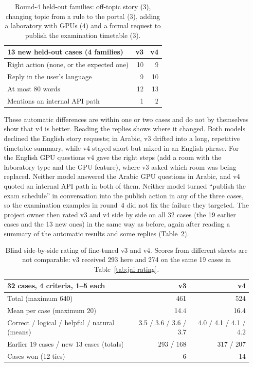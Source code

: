 \begin{table}[h]
\centering
\small
\begin{tabular}{@{}lrr@{}}
\toprule
13 new held-out cases (4 families) & v3 & v4 \\
\midrule
Right action (none, or the expected one) & 10 & 9 \\
Reply in the user's language & 9 & 10 \\
At most 80 words & 12 & 13 \\
Mentions an internal API path & 1 & 2 \\
\bottomrule
\end{tabular}
\caption{Round-4 held-out families: off-topic story (3), changing topic from a rule to the portal (3), adding a laboratory with GPUs (4) and a formal request to publish the examination timetable (3).}
\label{tab:jai-round4}
\end{table}

These automatic differences are within one or two cases and do not by themselves show that v4 is better. Reading the replies shows where it changed. Both models declined the English story requests; in Arabic, v3 drifted into a long, repetitive timetable summary, while v4 stayed short but mixed in an English phrase. For the English GPU questions v4 gave the right steps (add a room with the laboratory type and the GPU feature), where v3 asked which room was being replaced. Neither model answered the Arabic GPU questions in Arabic, and v4 quoted an internal API path in both of them. Neither model turned ``publish the exam schedule'' in conversation into the publish action in any of the three cases, so the examination examples in round~4 did not fix the failure they targeted. The project owner then rated v3 and v4 side by side on all 32 cases (the 19 earlier cases and the 13 new ones) in the same way as before, again after reading a summary of the automatic results and some replies (Table~\ref{tab:jai-rating-v4}).

\begin{table}[h]
\centering
\small
\begin{tabular}{@{}lrr@{}}
\toprule
32 cases, 4 criteria, 1--5 each & v3 & v4 \\
\midrule
Total (maximum 640) & 461 & 524 \\
Mean per case (maximum 20) & 14.4 & 16.4 \\
Correct / logical / helpful / natural (means) & 3.5 / 3.6 / 3.6 / 3.7 & 4.0 / 4.1 / 4.1 / 4.2 \\
Earlier 19 cases / new 13 cases (totals) & 293 / 168 & 317 / 207 \\
Cases won (12 ties) & 6 & 14 \\
\bottomrule
\end{tabular}
\caption{Blind side-by-side rating of fine-tuned v3 and v4. Scores from different sheets are not comparable: v3 received 293 here and 274 on the same 19 cases in Table~\ref{tab:jai-rating}.}
\label{tab:jai-rating-v4}
\end{table}

